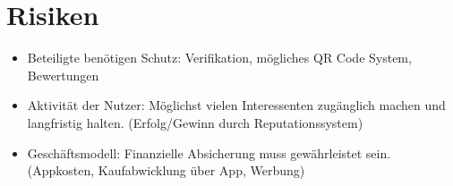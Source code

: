 
\section{Risiken}
\begin{itemize}
   \item Beteiligte benötigen Schutz: Verifikation, mögliches QR Code System, Bewertungen
   \item Aktivität der Nutzer: Möglichst vielen Interessenten zugänglich machen und langfristig halten. (Erfolg/Gewinn durch Reputationssystem)
   \item Geschäftsmodell: Finanzielle Absicherung muss gewährleistet sein. (Appkosten, Kaufabwicklung über App, Werbung)
\end{itemize}
 